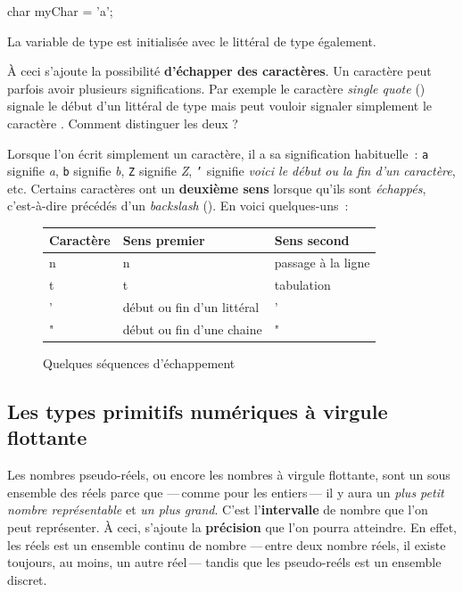 \begin{java}
	char myChar = 'a';
\end{java}

La variable  de type  est initialisée avec le littéral
 de type  également. 

À ceci s'ajoute la possibilité \textbf{d'échapper des caractères}. Un caractère
peut parfois avoir plusieurs significations. Par exemple le caractère
\textit{single quote} () signale le début d'un littéral de type 
mais peut vouloir signaler simplement le caractère .   
Comment distinguer les deux ?

Lorsque l'on écrit simplement un caractère, il a sa signification habituelle~: 
\texttt{a} signifie \textit{a},
\texttt{b} signifie \textit{b},
\texttt{Z} signifie \textit{Z},
\texttt{'} signifie \textit{voici le début ou la fin d'un caractère}, etc. 
Certains caractères ont un \textbf{deuxième sens} lorsque qu'ils sont 
\textit{échappés}, c'est-à-dire précédés d'un \textit{backslash} 
(\pc{\textbackslash}). En voici quelques-uns~:

\begin{figure}[h]
	\centering
	\begin{tabular}[h]{|l|l|l|}
		\hline
		\rowcolor{black!20}
		\textbf{Caractère}	&	\textbf{Sens premier}	& \textbf{Sens second}	\\
		\hline
		n					&	n						& passage à la ligne	\\
		t					&	t						& tabulation		\\
		'					&	début ou fin d'un littéral \pc{char}	
														&	'	\\
		"					& 	début ou fin d'une chaine 	
														&	"	\\
		\hline
	\end{tabular}
	\caption{Quelques séquences d'échappement}
	\label{tab:séquenceséchappements}
\end{figure}



\subsection{Les types primitifs numériques à virgule flottante}

Les nombres pseudo-réels, ou encore les nombres à virgule flottante, sont un
sous ensemble des réels parce que —\,comme pour les entiers\,— il y aura un
\textit{plus petit nombre représentable} et \textit{un plus grand}. C'est
l'\textbf{intervalle} de nombre que l'on peut représenter. À ceci, s'ajoute la
\textbf{précision} que l'on pourra atteindre. En effet, les réels est un
ensemble continu de nombre —\,entre deux nombre réels, il existe toujours, au
moins, un autre réel\,— tandis que les pseudo-reéls est un ensemble discret. 


